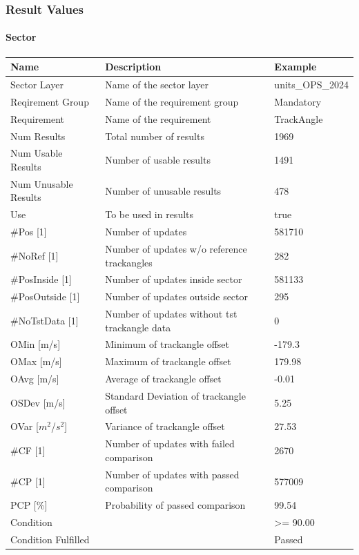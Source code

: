 \subsubsection{Result Values}

\paragraph{Sector}

\begin{center}
 \begin{table}[H]
  \begin{tabularx}{\textwidth}{ | l | X |  l | }
    \hline
    \textbf{Name} & \textbf{Description} & \textbf{Example} \\ \hline
    Sector Layer & Name of the sector layer & units\_OPS\_2024 \\ \hline
    Reqirement Group & Name of the requirement group & Mandatory \\ \hline
    Requirement & Name of the requirement & TrackAngle \\ \hline
    Num Results & Total number of results & 1969 \\ \hline
    Num Usable Results & Number of usable results & 1491 \\ \hline
    Num Unusable Results & Number of unusable results & 478 \\ \hline
    Use & To be used in results & true \\ \hline
    \#Pos [1] & Number of updates & 581710 \\ \hline
    \#NoRef [1] & Number of updates w/o reference trackangles & 282 \\ \hline
    \#PosInside [1] & Number of updates inside sector & 581133 \\ \hline
    \#PosOutside [1] & Number of updates outside sector & 295 \\ \hline
    \#NoTstData [1] & Number of updates without tst trackangle data & 0 \\ \hline
    OMin [m/s] & Minimum of trackangle offset & -179.3 \\ \hline
    OMax [m/s] & Maximum of trackangle offset & 179.98 \\ \hline
    OAvg [m/s] & Average of trackangle offset & -0.01 \\ \hline
    OSDev [m/s] & Standard Deviation of trackangle offset & 5.25 \\ \hline
    OVar [$m^2$/$s^2$] & Variance of trackangle offset & 27.53 \\ \hline
    \#CF [1] & Number of updates with failed comparison & 2670 \\ \hline
    \#CP [1] & Number of updates with passed comparison & 577009 \\ \hline
    PCP [\%] & Probability of passed comparison & 99.54 \\ \hline
    Condition &  & >= 90.00 \\ \hline
    Condition Fulfilled &  & Passed \\ \hline
\end{tabularx}
\end{table}
\end{center}

